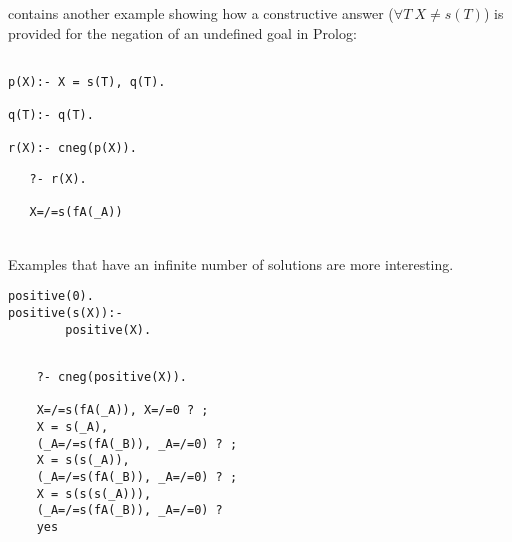 \documentclass{llncs}
\begin{document}
\cite{Stuckey95} contains another example showing how a constructive
answer ($\forall T ~ X \neq s(T)$) is provided for the negation of an
undefined goal in Prolog:

\begin{minipage}{2in}
\begin{verbatim}

p(X):- X = s(T), q(T).

q(T):- q(T).

r(X):- cneg(p(X)).
\end{verbatim}
\end{minipage}
\begin{minipage}{2in}
\begin{verbatim} 
   ?- r(X).

   X=/=s(fA(_A))

\end{verbatim} 
\end{minipage}\\



Examples that have an infinite number of solutions are more
interesting.

\begin{minipage}{1.5in}
\begin{verbatim}
positive(0). 
positive(s(X)):-
        positive(X).  
\end{verbatim}
\end{minipage} 
\begin{minipage}{2.5in}
\begin{verbatim} 

    ?- cneg(positive(X)).

    X=/=s(fA(_A)), X=/=0 ? ;
    X = s(_A), 
    (_A=/=s(fA(_B)), _A=/=0) ? ;
    X = s(s(_A)), 
    (_A=/=s(fA(_B)), _A=/=0) ? ;
    X = s(s(s(_A))),
    (_A=/=s(fA(_B)), _A=/=0) ? 
    yes
\end{verbatim} 
\end{minipage}
\end{document}
